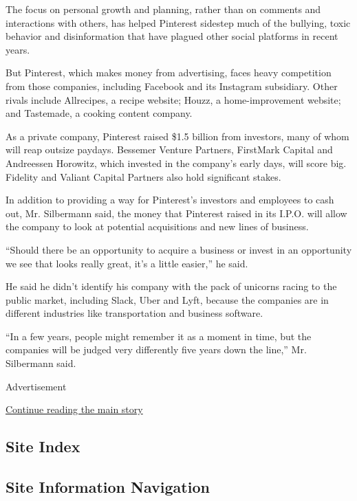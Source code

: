 The focus on personal growth and planning, rather than on comments and
interactions with others, has helped Pinterest sidestep much of the
bullying, toxic behavior and disinformation that have plagued other
social platforms in recent years.

But Pinterest, which makes money from advertising, faces heavy
competition from those companies, including Facebook and its Instagram
subsidiary. Other rivals include Allrecipes, a recipe website; Houzz, a
home-improvement website; and Tastemade, a cooking content company.

As a private company, Pinterest raised \$1.5 billion from investors,
many of whom will reap outsize paydays. Bessemer Venture Partners,
FirstMark Capital and Andreessen Horowitz, which invested in the
company's early days, will score big. Fidelity and Valiant Capital
Partners also hold significant stakes.

In addition to providing a way for Pinterest's investors and employees
to cash out, Mr. Silbermann said, the money that Pinterest raised in its
I.P.O. will allow the company to look at potential acquisitions and new
lines of business.

``Should there be an opportunity to acquire a business or invest in an
opportunity we see that looks really great, it's a little easier,'' he
said.

He said he didn't identify his company with the pack of unicorns racing
to the public market, including Slack, Uber and Lyft, because the
companies are in different industries like transportation and business
software.

``In a few years, people might remember it as a moment in time, but the
companies will be judged very differently five years down the line,''
Mr. Silbermann said.

Advertisement

\protect\hyperlink{after-bottom}{Continue reading the main story}

\hypertarget{site-index}{%
\subsection{Site Index}\label{site-index}}

\hypertarget{site-information-navigation}{%
\subsection{Site Information
Navigation}\label{site-information-navigation}}

